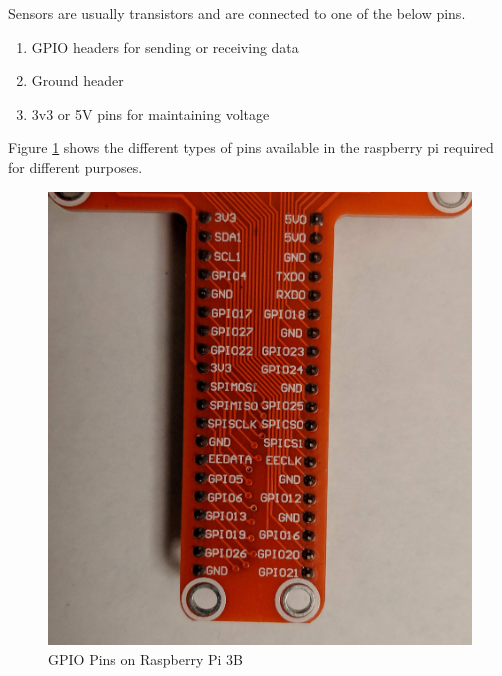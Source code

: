 \documentclass[11pt,openright]{report}
\begin{document}
Sensors are usually transistors and are connected to one of the below pins.
\begin{enumerate}
\item GPIO headers for sending or receiving data
\item  Ground header 
\item  3v3 or 5V pins for maintaining voltage
\end{enumerate}
Figure \ref{fig:gpio_pins} shows the different types of pins available in the raspberry pi required for different purposes.
\newline
\newline
\begin{figure}[!htbp]
    \centering
    \includegraphics[scale=0.08]{images/gpiopins.jpg}
    \caption{GPIO Pins on Raspberry Pi 3B}
    \label{fig:gpio_pins}
\end{figure}
\newline
\newline
\end{document}
